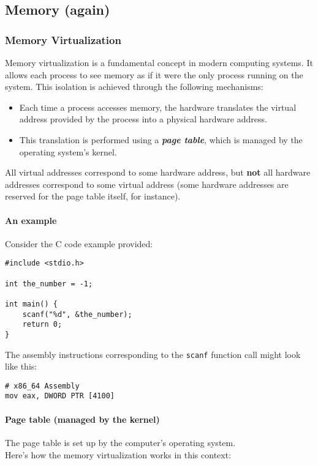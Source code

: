 \documentclass[12pt]{article}
\begin{document}
\subsection{Memory (again)} %
\subsubsection{Memory Virtualization}
Memory virtualization is a fundamental concept in modern computing systems. It allows each process to see memory as if it were the only process running on the system. This isolation is achieved through the following mechanisms:

\begin{itemize}
    \item Each time a process accesses memory, the hardware translates the virtual address provided by the process into a physical hardware address.
    \item This translation is performed using a \textit{\textbf{page table}}, which is managed by the operating system's kernel.
\end{itemize}
All virtual addresses correspond to some hardware address, but \textbf{not} all hardware addresses correspond to some virtual address (some hardware addresses are reserved for the page table itself, for instance).

\paragraph{An example}
Consider the C code example provided:

\begin{verbatim}
#include <stdio.h>

int the_number = -1;

int main() {
    scanf("%d", &the_number);
    return 0;
}
\end{verbatim}

The assembly instructions corresponding to the \texttt{scanf} function call might look like this:

\begin{verbatim}
# x86_64 Assembly
mov eax, DWORD PTR [4100]
\end{verbatim}

\paragraph{Page table (managed by the kernel)}
The page table is set up by the computer's operating system.\\
Here's how the memory virtualization works in this context:
\end{document}
